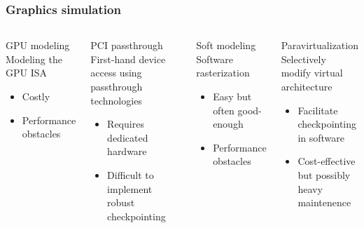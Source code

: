 \begin{frame}
\frametitle{Graphics simulation}

\begin{columns}
	\begin{block}{GPU modeling}
		Modeling the GPU ISA
                \begin{itemize}
                  \item Costly
                  \item Performance obstacles
                \end{itemize}
	\end{block}
	\begin{block}{PCI passthrough}
		First-hand device access using passthrough technologies
                \begin{itemize}
                  \item Requires dedicated hardware\phantom{     }
                  \item Difficult to implement robust checkpointing
                \end{itemize}
	\end{block}
    \begin{block}{Soft modeling}
    	Software rasterization
        \begin{itemize}
        \item Easy but often good-enough
        \item Performance obstacles
        \end{itemize}
    \end{block}
    \begin{block}{Paravirtualization}
    	Selectively modify virtual architecture
        \begin{itemize}
          \item Facilitate checkpointing in software
          \item Cost-effective but possibly heavy maintenence
        \end{itemize}
    \end{block}
\end{columns}
	
\end{frame}
